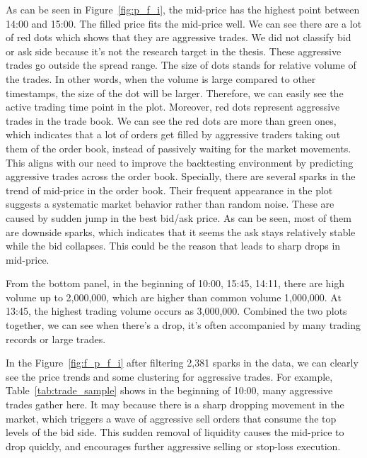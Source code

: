 

As can be seen in Figure~\ref{fig:p_f_i}, the mid-price has the highest point between 14:00 and 15:00. The filled price fits the mid-price well. We can see there are a lot of red dots which shows that they are aggressive trades. We did not classify bid or ask side because it's not the research target in the thesis. These aggressive trades go outside the spread range. The size of dots stands for relative volume of the trades. In other words, when the volume is large compared to other timestamps, the size of the dot will be larger. Therefore, we can easily see the active trading time point in the plot. Moreover, red dots represent aggressive trades in the trade book. We can see the red dots are more than green ones, which indicates that a lot of orders get filled by aggressive traders taking out them of the order book, instead of passively waiting for the market movements. This aligns with our need to improve the backtesting environment by predicting aggressive trades across the order book. Specially, there are several sparks in the trend of mid-price in the order book. Their frequent appearance in the plot suggests a systematic market behavior rather than random noise. These are caused by sudden jump in the best bid/ask price. As can be seen, most of them are downside sparks, which indicates that it seems the ask stays relatively stable while the bid collapses. This could be the reason that leads to sharp drops in mid-price.

From the bottom panel, in the beginning of 10:00, 15:45, 14:11, there are high volume up to 2,000,000, which are higher than common volume 1,000,000. At 13:45, the highest trading volume occurs as 3,000,000. Combined the two plots together, we can see when there's a drop, it's often accompanied by many trading records or large trades. 

In the Figure~\ref{fig:f_p_f_i} after filtering 2,381 sparks in the data, we can clearly see the price trends and some clustering for aggressive trades. For example, Table~\ref{tab:trade_sample} shows in the beginning of 10:00, many aggressive trades gather here. It may because there is a sharp dropping movement in the market, which triggers a wave of aggressive sell orders that consume the top levels of the bid side. This sudden removal of liquidity causes the mid-price to drop quickly, and encourages further aggressive selling or stop-loss execution.  

